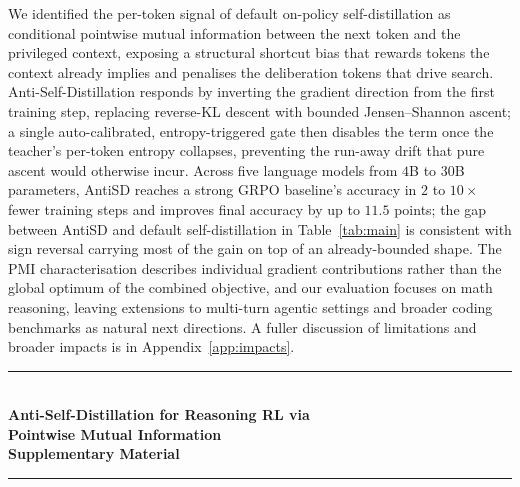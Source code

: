 \documentclass{llmxive}
\begin{document}
We identified the per-token signal of default on-policy self-distillation as conditional pointwise mutual information between the next token and the privileged context, exposing a structural shortcut bias that rewards tokens the context already implies and penalises the deliberation tokens that drive search. Anti-Self-Distillation responds by inverting the gradient direction from the first training step, replacing reverse-KL descent with bounded Jensen--Shannon ascent; a single auto-calibrated, entropy-triggered gate then disables the term once the teacher's per-token entropy collapses, preventing the run-away drift that pure ascent would otherwise incur. Across five language models from $4$B to $30$B parameters, AntiSD reaches a strong GRPO baseline's accuracy in $2$ to $10\times$ fewer training steps and improves final accuracy by up to $11.5$ points; the gap between AntiSD and default self-distillation in Table~\ref{tab:main} is consistent with sign reversal carrying most of the gain on top of an already-bounded shape. The PMI characterisation describes individual gradient contributions rather than the global optimum of the combined objective, and our evaluation focuses on math reasoning, leaving extensions to multi-turn agentic settings and broader coding benchmarks as natural next directions. A fuller discussion of limitations and broader impacts is in Appendix~\ref{app:impacts}.





\appendix

\begin{center}
  \noindent\rule{\linewidth}{3pt}\\[6pt]
  {\Large\bfseries Anti-Self-Distillation for Reasoning RL via\\[0.25em] Pointwise Mutual Information\\[0.4em] Supplementary Material}\\[6pt]
  \noindent\rule{\linewidth}{1pt}
\end{center}
\vspace{1em}
\end{document}
